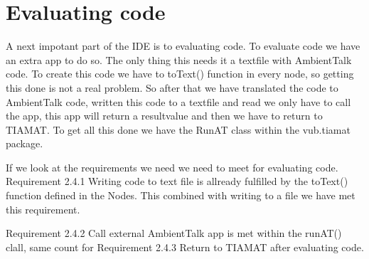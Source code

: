 \documentclass[a4paper,12pt]{report}
\begin{document}
\section{Evaluating code}
A next impotant part of the IDE is to evaluating code. To evaluate code we have an extra app to do so. The only thing this needs 
it a textfile with AmbientTalk code. To create this code we have to toText() function in every node, so getting this done is not a 
real problem. So after that we have translated the code to AmbientTalk code, written this code to a textfile and read we only have to
call the app, this app will return a resultvalue and then we have to return to TIAMAT. To get all this done we have the RunAT class 
within the vub.tiamat package. 

If we look at the requirements we need we need to meet for evaluating code. Requirement 2.4.1 Writing code to text file is allready
fulfilled by the toText() function defined in the Nodes. This combined with writing to a file we have met this requirement.

Requirement 2.4.2 Call external AmbientTalk app is met within the runAT() clall, same count for Requirement 2.4.3 Return to TIAMAT after
evaluating code. 
\end{document}

